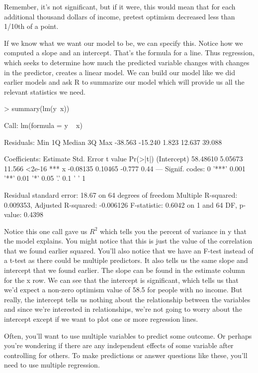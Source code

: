 \documentclass[12pt]{article}
\newcounter{subsubsubsection}[subsubsection]
\begin{document}
Remember, it's not significant, but if it were, this would mean that for each additional
thousand dollars of income, pretest optimism decreased less than 1/10th of a point.

If we know what we want our model to be, we can specify this. Notice how we computed a
slope and an intercept. That's the formula for a line. Thus regression, which seeks to
determine how much the predicted variable changes with changes in the predictor, creates
a linear model. We can build our model like we did earlier models and ask R to summarize
our model which will provide us all the relevant statistics we need.

\begin{Schunk}
\begin{Sinput}
> summary(lm(y~x))
\end{Sinput}
\begin{Soutput}
Call:
lm(formula = y ~ x)

Residuals:
    Min      1Q  Median      3Q     Max 
-38.563 -15.240   1.823  12.637  39.088 

Coefficients:
            Estimate Std. Error t value Pr(>|t|)    
(Intercept) 58.48610    5.05673  11.566   <2e-16 ***
x           -0.08135    0.10465  -0.777     0.44    
---
Signif. codes:  
0 '***' 0.001 '**' 0.01 '*' 0.05 '.' 0.1 ' ' 1

Residual standard error: 18.67 on 64 degrees of freedom
Multiple R-squared:  0.009353,	Adjusted R-squared:  -0.006126 
F-statistic: 0.6042 on 1 and 64 DF,  p-value: 0.4398
\end{Soutput}
\end{Schunk}

Notice this one call gave us $R^2$ which tells you the percent of variance in y that the
model explains. You might notice that this is just the value of the correlation that we
found earlier squared. You'll also notice that we have an F-test instead of a t-test as
there could be multiple predictors. It also tells us the same slope and intercept that we
found earlier. The slope can be found in the estimate column for the x row. We can see
that the intercept is significant, which tells us that we'd expect a non-zero optimism value
of 58.5 for people with no income. But really, the intercept tells us nothing about the
relationship between the variables and since we're interested in relationships, we're not
going to worry about the intercept except if we want to plot one or more regression lines.

Often, you'll want to use multiple variables to predict some outcome. Or perhaps
you're wondering if there are any independent effects of some variable after controlling
for others. To make predictions or answer questions like these, you'll need to use multiple
regression.
\end{document}
